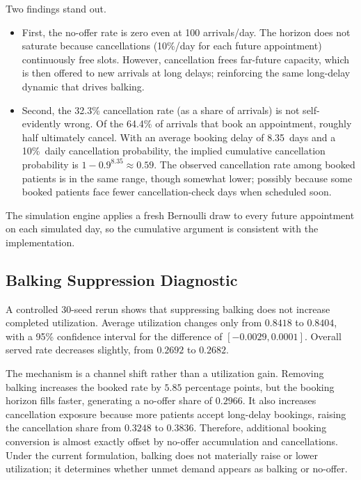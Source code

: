 \documentclass[11pt]{article}
\begin{document}
Two findings stand out. 
\begin{itemize}
    \item First, the no-offer rate is zero even at 100
arrivals/day. The horizon does not saturate because cancellations
(10\%/day for each future appointment) continuously free slots. However,
cancellation frees far-future capacity, which is then offered to new
arrivals at long delays; reinforcing the same long-delay dynamic that
drives balking.

\item Second, the 32.3\% cancellation rate (as a share of arrivals) is not
self-evidently wrong. Of the 64.4\% of arrivals that book an appointment,
roughly half ultimately cancel. With an average booking delay of 8.35~days
and a 10\%~daily cancellation probability, the implied cumulative
cancellation probability is $1 - 0.9^{8.35} \approx 0.59$. The observed
cancellation rate among booked patients is in the same range, though
somewhat lower; possibly because some booked patients face fewer
cancellation-check days when scheduled soon.
\end{itemize}

The simulation engine applies a
fresh Bernoulli draw to every future appointment on each simulated day, so the
cumulative argument is consistent with the implementation.

\subsection{Balking Suppression Diagnostic}
\label{sec:balk-suppression}

A controlled 30-seed rerun shows that suppressing balking does not increase
completed utilization. Average utilization changes only from \(0.8418\) to
\(0.8404\), with a 95\% confidence interval for the difference of
\([-0.0029,0.0001]\). Overall served rate decreases slightly, from
\(0.2692\) to \(0.2682\).

The mechanism is a channel shift rather than a utilization gain. Removing
balking increases the booked rate by \(5.85\) percentage points, but the
booking horizon fills faster, generating a no-offer share of \(0.2966\). It
also increases cancellation exposure because more patients accept long-delay
bookings, raising the cancellation share from \(0.3248\) to \(0.3836\).
Therefore, additional booking conversion is almost exactly offset by no-offer
accumulation and cancellations. Under the current formulation, balking does
not materially raise or lower utilization; it determines whether unmet demand
appears as balking or no-offer.
\end{document}
